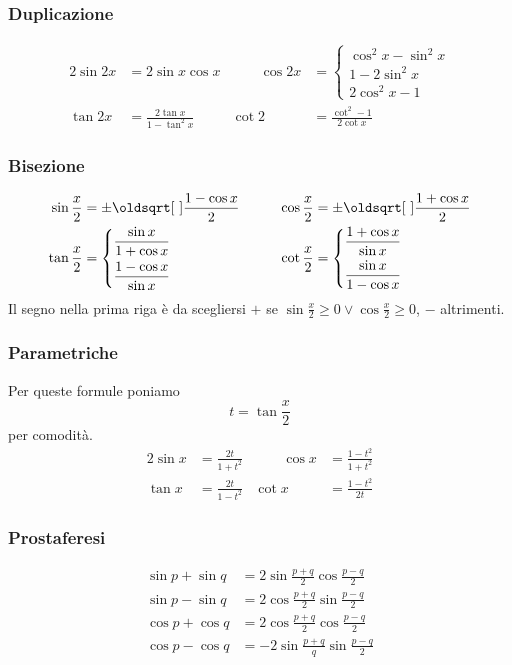 \subsubsection{Duplicazione}
\begin{alignat*}{2}
\sin2x & =2\sin x\cos x &\qquad \cos2x &= \begin{cases}
\cos^2x - \sin^2x\\
1-2\sin^2x\\
2\cos^2x-1
\end{cases}\\
\tan2x &= \frac{2\tan x}{1-\tan^2x} & \cot2 &= \frac{\cot^2-1}{2\cot x}
\end{alignat*}

\subsubsection{Bisezione}
\begin{alignat*}{2}
\sin\frac{x}{2}&=\pm\sqrt{\frac{1-\cos x}{2}} &\qquad \cos\frac{x}{2}&=\pm\sqrt{\frac{1+\cos x}{2}}\\
\tan\frac{x}{2}&=\begin{dcases}
\frac{\sin x}{1+\cos x}\\
\frac{1-\cos x}{\sin x}
\end{dcases} & \cot\frac{x}{2} &= \begin{dcases}
\frac{1+\cos x}{\sin x}\\
\frac{\sin x}{1-\cos x}
\end{dcases}
\end{alignat*}
Il segno nella prima riga è da scegliersi $+$ se 
$\sin\frac{x}{2}\geq0\lor\cos\frac{x}{2}\geq0$, $-$ altrimenti.

\subsubsection{Parametriche}
Per queste formule poniamo
\begin{equation*}
t = \tan\frac{x}{2}
\end{equation*}
per comodità.
\begin{alignat*}{2}
\sin x &= \frac{2t}{1+t^2} &\qquad \cos x &= \frac{1-t^2}{1+t^2}\\
\tan x &= \frac{2t}{1-t^2} & \cot x &= \frac{1-t^2}{2t}
\end{alignat*}

\subsubsection{Prostaferesi}
\begin{align*}
\sin p + \sin q &= 2\sin\frac{p+q}{2}\cos\frac{p-q}{2}\\
\sin p-\sin q &=2\cos\frac{p+q}{2}\sin\frac{p-q}{2}\\
\cos p+\cos q&=2\cos\frac{p+q}{2}\cos\frac{p-q}{2}\\
\cos p-\cos q&=-2\sin\frac{p+q}{q}\sin\frac{p-q}{2}
\end{align*}

